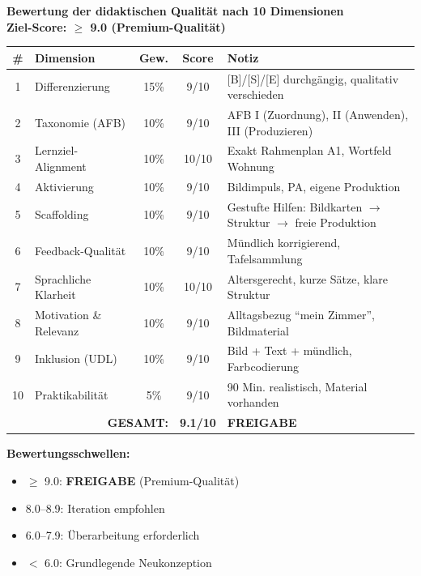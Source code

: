 \documentclass[11pt,a4paper]{article}
\begin{document}
\begin{scorebox}
\textbf{Bewertung der didaktischen Qualität nach 10 Dimensionen}\\
\textbf{Ziel-Score: $\geq$ 9.0 (Premium-Qualität)}

\vspace{1em}
\begin{tabular}{|c|l|c|c|p{4.5cm}|}
\hline
\textbf{\#} & \textbf{Dimension} & \textbf{Gew.} & \textbf{Score} & \textbf{Notiz} \\
\hline
1 & Differenzierung & 15\% & 9/10 & [B]/[S]/[E] durchgängig, qualitativ verschieden \\
\hline
2 & Taxonomie (AFB) & 10\% & 9/10 & AFB I (Zuordnung), II (Anwenden), III (Produzieren) \\
\hline
3 & Lernziel-Alignment & 10\% & 10/10 & Exakt Rahmenplan A1, Wortfeld Wohnung \\
\hline
4 & Aktivierung & 10\% & 9/10 & Bildimpuls, PA, eigene Produktion \\
\hline
5 & Scaffolding & 10\% & 9/10 & Gestufte Hilfen: Bildkarten $\rightarrow$ Struktur $\rightarrow$ freie Produktion \\
\hline
6 & Feedback-Qualität & 10\% & 9/10 & Mündlich korrigierend, Tafelsammlung \\
\hline
7 & Sprachliche Klarheit & 10\% & 10/10 & Altersgerecht, kurze Sätze, klare Struktur \\
\hline
8 & Motivation \& Relevanz & 10\% & 9/10 & Alltagsbezug ``mein Zimmer'', Bildmaterial \\
\hline
9 & Inklusion (UDL) & 10\% & 9/10 & Bild + Text + mündlich, Farbcodierung \\
\hline
10 & Praktikabilität & 5\% & 9/10 & 90 Min. realistisch, Material vorhanden \\
\hline
\multicolumn{3}{|r|}{\textbf{GESAMT:}} & \textbf{9.1/10} & \textcolor{successgreen}{\textbf{FREIGABE}} \\
\hline
\end{tabular}

\vspace{1em}
\textbf{Bewertungsschwellen:}
\begin{itemize}
    \item[$\boxtimes$] \textcolor{successgreen}{$\geq$ 9.0: \textbf{FREIGABE} (Premium-Qualität)}
    \item[$\Box$] \textcolor{warningorange}{8.0--8.9: Iteration empfohlen}
    \item[$\Box$] 6.0--7.9: Überarbeitung erforderlich
    \item[$\Box$] $<$ 6.0: Grundlegende Neukonzeption
\end{itemize}
\end{scorebox}
\end{document}
